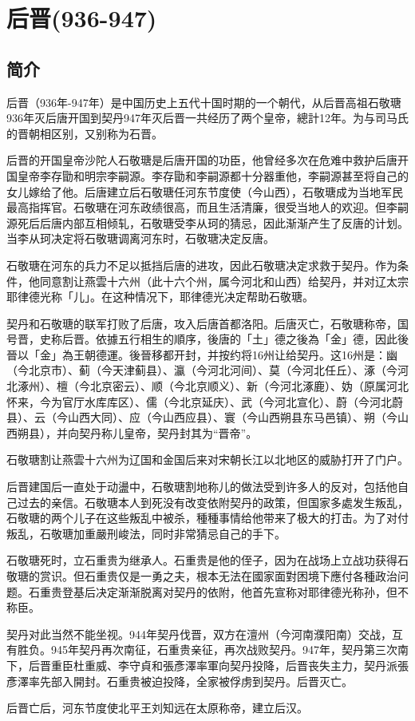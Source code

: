 

\section{后晋\tiny(936-947)}

\subsection{简介}

后晋（936年-947年）是中国历史上五代十国时期的一个朝代，从后晋高祖石敬瑭936年灭后唐开国到契丹947年灭后晋一共经历了两个皇帝，總計12年。为与司马氏的晋朝相区别，又别称为石晋。

后晋的开国皇帝沙陀人石敬瑭是后唐开国的功臣，他曾经多次在危难中救护后唐开国皇帝李存勖和明宗李嗣源。李存勖和李嗣源都十分器重他，李嗣源甚至将自己的女儿嫁给了他。后唐建立后石敬瑭任河东节度使（今山西），石敬瑭成为当地军民最高指挥官。石敬瑭在河东政绩很高，而且生活清廉，很受当地人的欢迎。但李嗣源死后后唐内部互相倾轧，石敬瑭受李从珂的猜忌，因此渐渐产生了反唐的计划。当李从珂决定将石敬瑭调离河东时，石敬瑭决定反唐。

石敬瑭在河东的兵力不足以抵挡后唐的进攻，因此石敬瑭决定求救于契丹。作为条件，他同意割让燕雲十六州（此十六个州，属今河北和山西）给契丹，并对辽太宗耶律德光称「儿」。在这种情况下，耶律德光决定帮助石敬瑭。

契丹和石敬瑭的联军打败了后唐，攻入后唐首都洛阳。后唐灭亡，石敬瑭称帝，国号晋，史称后晋。依據五行相生的順序，後唐的「土」德之後為「金」德，因此後晉以「金」為王朝德運。後晉移都开封，并按约将16州让给契丹。这16州是：幽（今北京市）、蓟（今天津蓟县）、瀛（今河北河间）、莫（今河北任丘）、涿（今河北涿州）、檀（今北京密云）、顺（今北京顺义）、新（今河北涿鹿）、妫（原属河北怀来，今为官厅水库库区）、儒（今北京延庆）、武（今河北宣化）、蔚（今河北蔚县）、云（今山西大同）、应（今山西应县）、寰（今山西朔县东马邑镇）、朔（今山西朔县），并向契丹称儿皇帝，契丹封其为“晋帝”。

石敬瑭割让燕雲十六州为辽国和金国后来对宋朝长江以北地区的威胁打开了门户。

后晋建国后一直处于动盪中，石敬瑭割地称儿的做法受到许多人的反对，包括他自己过去的亲信。石敬瑭本人到死没有改变依附契丹的政策，但国家多處发生叛乱，石敬瑭的两个儿子在这些叛乱中被杀，種種事情给他带来了极大的打击。为了对付叛乱，石敬瑭加重嚴刑峻法，同时非常猜忌自己的手下。

石敬瑭死时，立石重贵为继承人。石重贵是他的侄子，因为在战场上立战功获得石敬瑭的赏识。但石重贵仅是一勇之夫，根本无法在國家面對困境下應付各種政治问题。石重贵登基后决定渐渐脱离对契丹的依附，他首先宣称对耶律德光称孙，但不称臣。

契丹对此当然不能坐视。944年契丹伐晋，双方在澶州（今河南濮阳南）交战，互有胜负。945年契丹再次南征，石重贵亲征，再次战败契丹。947年，契丹第三次南下，后晋重臣杜重威、李守貞和張彥澤率軍向契丹投降，后晋丧失主力，契丹派張彥澤率先部入開封。石重贵被迫投降，全家被俘虏到契丹。后晋灭亡。

后晋亡后，河东节度使北平王刘知远在太原称帝，建立后汉。





